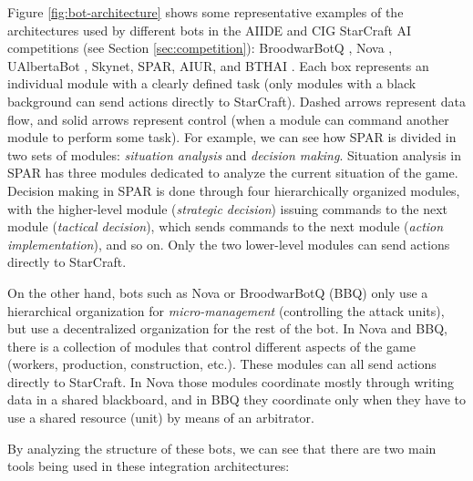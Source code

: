 \documentclass[journal]{IEEEtran}
\begin{document}
Figure \ref{fig:bot-architecture} shows some representative examples of the architectures used by different bots in the AIIDE and CIG StarCraft AI competitions (see Section \ref{sec:competition}): BroodwarBotQ \cite{SynnaeveMicroCig11}, Nova \cite{uriarte2012kiting}, UAlbertaBot \cite{churchill2011build}, Skynet, SPAR, AIUR, and BTHAI \cite{Hagelback12}. Each box represents an individual module with a clearly defined task (only modules with a black background can send actions directly to StarCraft). Dashed arrows represent data flow, and solid arrows represent control (when a module can command another module to perform some task). For example, we can see how SPAR is divided in two sets of modules: {\em situation analysis} and {\em decision making}. Situation analysis in SPAR has three modules dedicated to analyze the current situation of the game. Decision making in SPAR is done through four hierarchically organized modules, with the higher-level module ({\em strategic decision}) issuing commands to the next module ({\em tactical decision}), which sends commands to the next module ({\em action implementation}), and so on. Only the two lower-level modules can send actions directly to StarCraft. 

On the other hand, bots such as Nova or BroodwarBotQ (BBQ) only use a hierarchical organization for {\em micro-management} (controlling the attack units), but use a decentralized organization for the rest of the bot. In Nova and BBQ, there is a collection of modules that control different aspects of the game (workers, production, construction, etc.). These modules can all send actions directly to StarCraft. In Nova those modules coordinate mostly through writing data in a shared blackboard, and in BBQ they coordinate only when they have to use a shared resource (unit) by means of an arbitrator.

By analyzing the structure of these bots, we can see that there are two main tools being used in these integration architectures:
\end{document}
